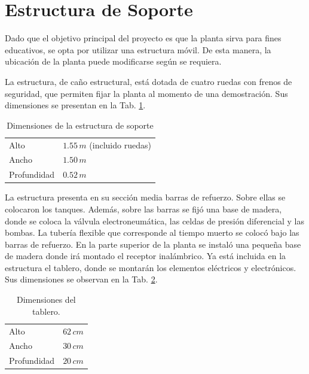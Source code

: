 \section{Estructura de Soporte}
\label{sec:EstructuraSoporte}

Dado que el objetivo principal del proyecto es que la planta sirva para fines
educativos, se opta por utilizar una estructura móvil.
De esta manera, la ubicación de la planta puede modificarse según se requiera.

La estructura, de caño estructural, está dotada de cuatro ruedas con frenos de
seguridad, que permiten fijar la
planta al momento de una demostración.
Sus dimensiones se presentan en la Tab. \ref{tab:dimensionesEstructura}.

\begin{table}[ht]
\renewcommand{\arraystretch}{1.3}
\centering
\begin{tabular}{|l|l|}
\hline
Alto & $1.55\,m$ (incluido ruedas)\\
Ancho &  $1.50\,m$\\
Profundidad &  $0.52\,m$\\
\hline
\end{tabular}
\caption{Dimensiones de la estructura de soporte}
\label{tab:dimensionesEstructura}
\end{table}
 
La estructura presenta en su sección media barras de refuerzo.
Sobre ellas se colocaron los tanques.
Además, sobre las barras se fijó una base de madera, donde se coloca la
válvula electroneumática, las celdas de presión diferencial
y las bombas.
La tubería flexible que corresponde al tiempo muerto se colocó bajo
las barras de refuerzo.
En la parte superior de la planta se instaló una pequeña base de
madera donde irá montado el receptor inalámbrico.
Ya está incluida en la estructura el tablero, donde se
montarán los elementos eléctricos y electrónicos.
Sus dimensiones se observan en la Tab. \ref{tab:dimensionesTablero}.

\begin{table}[h]
\renewcommand{\arraystretch}{1.3}
\centering
\begin{tabular}{|l|l|}
\hline
Alto & $62\,cm$\\
Ancho &  $30\,cm$\\
Profundidad &  $20\,cm$\\
\hline
\end{tabular}
\caption{Dimensiones del tablero.}
\label{tab:dimensionesTablero}
\end{table}

